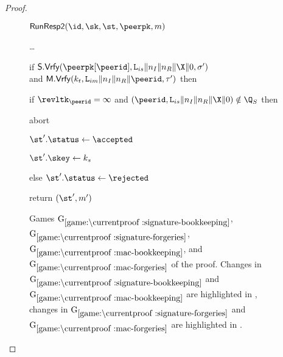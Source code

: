 \begin{proof}
\begin{collectinmacro}{\SIGMIProofSignatureMAC}{}{}
\begin{figure}[tp]
\begin{minipage}[t]{0.49\textwidth}
		\ExptSepSpace

		\begin{oracle}{$\RunRespII(\id,\sk,\st,\peerpk,m)$}
			\item \dots
			\item if $\SIGScheme.\SIGVerify(\peerpk[\peerid], \labelis\|\nonce_I\|\nonce_R\|\X\|\Y, \sigma')$\\
				and $\MACScheme.\MACVerify(\kt, \labelim\|\nonce_I\|\nonce_R\|\peerid, \tau')$ then
			\item \hindent if $\revltk_{\peerid} = \infty$ and \newline
				\null \hindent \hindent \hindent $(\peerid, \labelis\|\nonce_I\|\nonce_R\|\X\|\Y) \notin \Q_{S}$ then
			\item \hindent \hindent abort
			\item \hindent {}\newline
				\null \hindent \hindent {}
			\item \hindent \hindent \gamechange{$\bad[M] \gets \true$} 
			\item \hindent $\st'.\status \gets \accepted$
			\item \hindent $\st'.\skey \gets \ks$
			\item else $\st'.\status \gets \rejected$
			\item return $(\st', m')$
		\end{oracle}
	\end{minipage}

	\caption[]{%
		Games $\lblGm{signature-bookkeeping}$, $\lblGm{signature-forgeries}$, $\lblGm{mac-bookkeeping}$, and~$\lblGm{mac-forgeries}$ of the \SIGMAI proof.
		Changes in $\lblGm{signature-bookkeeping}$ and $\lblGm{mac-bookkeeping}$ are highlighted in ,
		changes in $\lblGm{signature-forgeries}$ and $\lblGm{mac-forgeries}$ are highlighted in .
	}
	\label{fig:SIGMAI-proof:game:signature-bookkeeping}
	\label{fig:SIGMAI-proof:game:signature-forgeries}
	\label{fig:SIGMAI-proof:game:mac-bookkeeping}
	\label{fig:SIGMAI-proof:game:mac-forgeries}
	
	\iffull\else %
	\label{apxfig:SIGMAI-proof:signature-mac-games}
	\fi
\end{figure}
\end{collectinmacro}


\end{proof}
